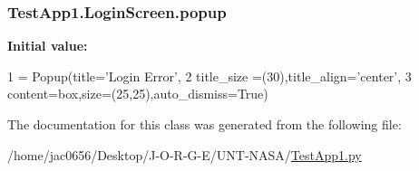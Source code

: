\subsubsection[{\texorpdfstring{popup}{popup}}]{\setlength{\rightskip}{0pt plus 5cm}Test\+App1.\+Login\+Screen.\+popup\hspace{0.3cm}{\ttfamily [static]}}\hypertarget{classTestApp1_1_1LoginScreen_ab64836ea6220beb4d6141a08d1c1cdb6}{}\label{classTestApp1_1_1LoginScreen_ab64836ea6220beb4d6141a08d1c1cdb6}
{\bfseries Initial value\+:}
\begin{DoxyCode}
1 = Popup(title=\textcolor{stringliteral}{'Login Error'},
2                           title\_size =(30),title\_align=\textcolor{stringliteral}{'center'},
3                           content=box,size=(25,25),auto\_dismiss=\textcolor{keyword}{True})
\end{DoxyCode}


The documentation for this class was generated from the following file\+:\begin{DoxyCompactItemize}
\item 
/home/jac0656/\+Desktop/\+J-\/\+O-\/\+R-\/\+G-\/\+E/\+U\+N\+T-\/\+N\+A\+S\+A/\hyperlink{TestApp1_8py}{Test\+App1.\+py}\end{DoxyCompactItemize}
